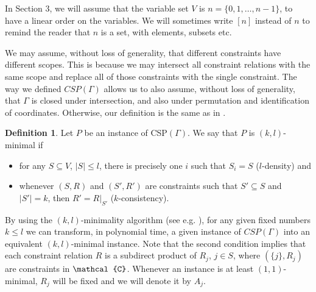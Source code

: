 \documentclass[11pt]{amsart}
\newcommand{\vr}[1]{{\uppercase {\mathcal{#1}}}}
\newcommand{\usub}{\subseteq}
\theoremstyle{definition}
\newtheorem{df}[thm]{Definition}
\begin{document}
In Section 3, we will assume that the variable set $V$ is $n=\{0,1,\dots,n-1\}$, to have a linear order on the variables. We will sometimes write $[n]$ instead of $n$ to remind the reader that $n$ is a set, with elements, subsets etc.

We may assume, without loss of generality, that different constraints have different scopes. This is because we may intersect all constraint relations with the same scope and replace all of those constraints with the single constraint. The way we defined $CSP(\Gamma)$ allows us to also assume, without loss of generality, that $\Gamma$ is closed under intersection, and also under permutation and identification of coordinates. Otherwise, our definition is the same as in \cite{barto-collapsewidth}.

\begin{df}\label{klminimaldef}
Let $P$ be an instance of CSP$(\Gamma)$. We say that $P$ is $(k,l)$-minimal if
\begin{itemize}
\item for any $S\usub V$, $|S|\leq l$, there is precisely one $i$ such that $S_i=S$ ($l$-density) and
\item whenever $(S,R)$ and $(S',R')$ are constraints such that $S'\usub S$ and $|S'|=k$, then $R'=R|_{S'}$ ($k$-consistency).
\end{itemize}
\end{df}

By using the $(k,l)$-minimality algorithm (see e.g. \cite{barto-collapsewidth}), for any given fixed numbers $k\leq l$ we can transform, in polynomial time, a given instance of $CSP(\Gamma)$ into an equivalent $(k,l)$-minimal instance. Note that the second condition implies that each constraint relation $R$ is a subdirect product of $R_j$, $j\in S$, where $(\{j\},R_j)$ are constraints in $\vr c$. Whenever an instance is at least $(1,1)$-minimal, $R_j$ will be fixed and we will denote it by $A_j$.
\end{document}
